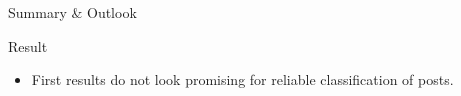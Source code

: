 \documentclass[aspectratio=169,xcolor=dvipsnames]{beamer}
\begin{document}
\begin{frame}{Summary \& Outlook}
    \begin{alertblock}{Result}
        \begin{itemize}
            \item First results do not look promising for reliable classification of posts.
        \end{itemize}
    \end{alertblock}

\end{frame}

\end{document}
